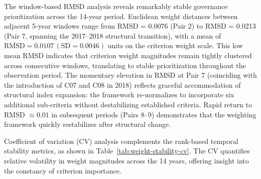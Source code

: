 \documentclass[12pt,a4paper]{article}
\begin{document}
The window-based RMSD analysis reveals remarkably stable governance prioritization across the 14-year period. Euclidean weight distances between adjacent 5-year windows range from RMSD = 0.0076 (Pair 2) to RMSD = 0.0213 (Pair 7, spanning the 2017--2018 structural transition), with a mean of $\bar{\mathrm{RMSD}} = 0.0107 \, (\mathrm{SD} = 0.0046)$ units on the criterion weight scale. This low mean RMSD indicates that criterion weight magnitudes remain tightly clustered across consecutive windows, translating to stable prioritization throughout the observation period. The momentary elevation in RMSD at Pair 7 (coinciding with the introduction of C07 and C08 in 2018) reflects graceful accommodation of structural index expansion: the framework re-normalizes to incorporate six additional sub-criteria without destabilizing established criteria. Rapid return to RMSD $\approx 0.01$ in subsequent periods (Pairs 8--9) demonstrates that the weighting framework quickly restabilizes after structural change.

Coefficient of variation (CV) analysis complements the rank-based temporal stability metrics, as shown in Table~\ref{tab:weight-stability-cv}. The CV quantifies relative volatility in weight magnitudes across the 14 years, offering insight into the constancy of criterion importance.

\renewcommand{\tabularxcolumn}[1]{m{#1}}
\end{document}

